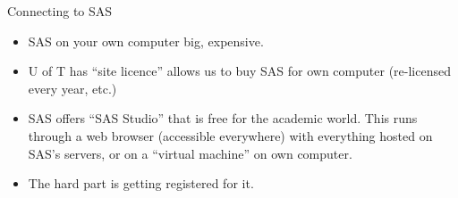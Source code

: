 \documentclass[unknownkeysallowed]{beamer}\usepackage[]{graphicx}\usepackage[]{color}
\begin{document}


\begin{frame}[fragile]{Connecting to SAS}

  \begin{itemize}
  \item SAS on your own computer big, expensive.
  \item U of T has ``site licence'' allows us to buy SAS for own
    computer (re-licensed every year, etc.)
  \item SAS offers ``SAS Studio'' that is free for the academic
    world. This runs through a web browser (accessible everywhere)
    with everything hosted on SAS's servers, or on a ``virtual
    machine'' on own computer.
  \item The hard part is getting registered for it.
  \end{itemize}
  
\end{frame}
\end{document}
